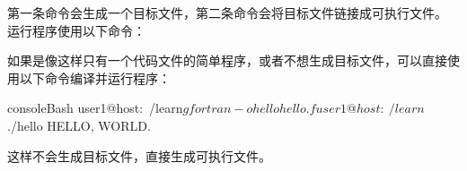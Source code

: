 第一条命令会生成一个目标文件，第二条命令会将目标文件链接成可执行文件。
运行程序使用以下命令：

如果是像这样只有一个代码文件的简单程序，或者不想生成目标文件，可以直接使用以下命令编译并运行程序：
\begin{envcode}{console}{Bash}
user1@host:~/learn$ gfortran -o hello hello.f
user1@host:~/learn$ ./hello
 HELLO, WORLD.
\end{envcode}

这样不会生成目标文件，直接生成可执行文件。
